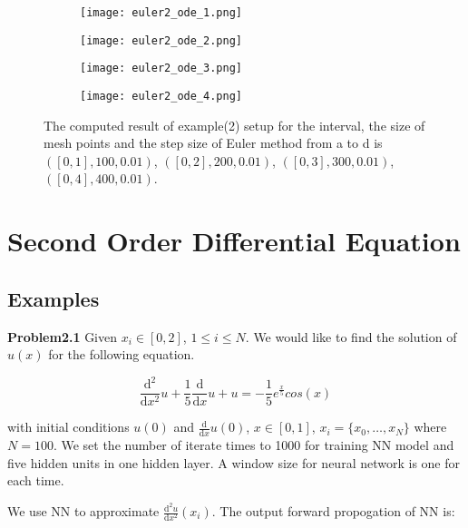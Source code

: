 \documentclass{article}
\begin{document}
\begin{figure}[b]
	\begin{subfigure}{.85\textwidth}
		\centering
		\texttt{[image: euler2\_ode\_1.png]}
		
	\end{subfigure}
	\begin{subfigure}{.85\textwidth}
		\centering
		\texttt{[image: euler2\_ode\_2.png]}
		
	\end{subfigure}
	\begin{subfigure}{.85\textwidth}
		\centering
		\texttt{[image: euler2\_ode\_3.png]}
		
	\end{subfigure}
	\begin{subfigure}{.85\textwidth}
		\centering
		\texttt{[image: euler2\_ode\_4.png]}
		
	\end{subfigure}
	\caption{The computed result of example(2) setup for  the interval, the size of mesh points and the step size of Euler method from a to d is $([0,1],100,0.01)$, $([0,2],200,0.01)$, $([0,3],300,0.01)$, $([0,4],400,0.01)$. } 
	\label{fig: euler2_ode}
\end{figure}

\section{Second Order Differential Equation}

\subsection{Examples}

\textbf{Problem2.1} Given $x_i \in [0,2]$, $1 \leq i \leq N$. We would like to find the solution of $u(x)$ for the following equation.

\[\frac{\mathrm{d}^2}{\mathrm{d}x^2} u + \frac{1}{5} \frac{\mathrm{d}}{\mathrm{d}x} u + u= -\frac{1}{5}e^{\frac{x}{5}}cos(x)\]

\medspace \noindent
with initial conditions $u(0)$ and $\frac{\mathrm{d}}{\mathrm{d}x} u(0)$, $x \in [0,1]$, $x_i=\{x_0, \dots, x_N\}$ where $N=100$. We set the number of iterate times to 1000 for training NN model and five hidden units in one hidden layer. A window size for neural network is one for each time.

We use NN to approximate $\frac{\mathrm{d}^{2}u}{\mathrm{d}x^{2}}(x_i)$. The output forward propogation of NN is:
\end{document}
